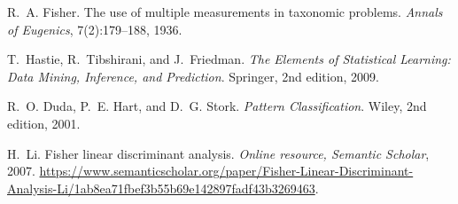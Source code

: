 \documentclass[12pt,a4paper]{article}
\begin{document}

\begin{thebibliography}{10}

R.~A. Fisher.
\newblock The use of multiple measurements in taxonomic problems.
\newblock \emph{Annals of Eugenics}, 7(2):179--188, 1936.

T.~Hastie, R.~Tibshirani, and J.~Friedman.
\newblock \emph{The Elements of Statistical Learning: Data Mining, Inference, and Prediction}.
\newblock Springer, 2nd edition, 2009.

R.~O. Duda, P.~E. Hart, and D.~G. Stork.
\newblock \emph{Pattern Classification}.
\newblock Wiley, 2nd edition, 2001.

H.~Li.
\newblock Fisher linear discriminant analysis.
\newblock \emph{Online resource, Semantic Scholar}, 2007.
\newblock \url{https://www.semanticscholar.org/paper/Fisher-Linear-Discriminant-Analysis-Li/1ab8ea71fbef3b55b69e142897fadf43b3269463}.

\end{thebibliography}
\end{document}
